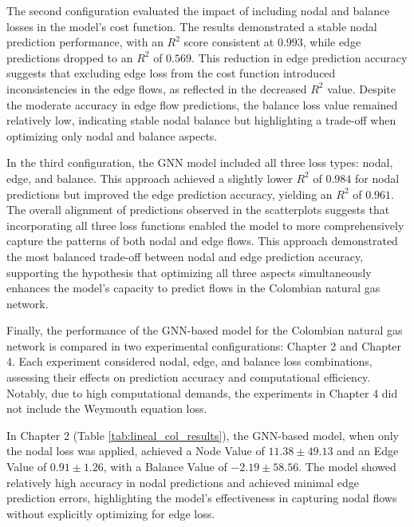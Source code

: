 The second configuration evaluated the impact of including nodal and balance losses in the model's cost function. The results demonstrated a stable nodal prediction performance, with an $R^2$ score consistent at $0.993$, while edge predictions dropped to an $R^2$ of $0.569$. This reduction in edge prediction accuracy suggests that excluding edge loss from the cost function introduced inconsistencies in the edge flows, as reflected in the decreased $R^2$ value. Despite the moderate accuracy in edge flow predictions, the balance loss value remained relatively low, indicating stable nodal balance but highlighting a trade-off when optimizing only nodal and balance aspects. 


In the third configuration, the GNN model included all three loss types: nodal, edge, and balance. This approach achieved a slightly lower $R^2$ of $0.984$ for nodal predictions but improved the edge prediction accuracy, yielding an $R^2$ of $0.961$. The overall alignment of predictions observed in the scatterplots suggests that incorporating all three loss functions enabled the model to more comprehensively capture the patterns of both nodal and edge flows. This approach demonstrated the most balanced trade-off between nodal and edge prediction accuracy, supporting the hypothesis that optimizing all three aspects simultaneously enhances the model's capacity to predict flows in the Colombian natural gas network. 



Finally, the performance of the GNN-based model for the Colombian natural gas network is compared in two experimental configurations: Chapter 2 and Chapter 4. Each experiment considered nodal, edge, and balance loss combinations, assessing their effects on prediction accuracy and computational efficiency. Notably, due to high computational demands, the experiments in Chapter 4 did not include the Weymouth equation loss.

In Chapter 2 (Table \ref{tab:lineal_col_results}), the GNN-based model, when only the nodal loss was applied, achieved a Node Value of \(11.38 \pm 49.13\) and an Edge Value of \(0.91 \pm 1.26\), with a Balance Value of \(-2.19 \pm 58.56\). The model showed relatively high accuracy in nodal predictions and achieved minimal edge prediction errors, highlighting the model’s effectiveness in capturing nodal flows without explicitly optimizing for edge loss.

